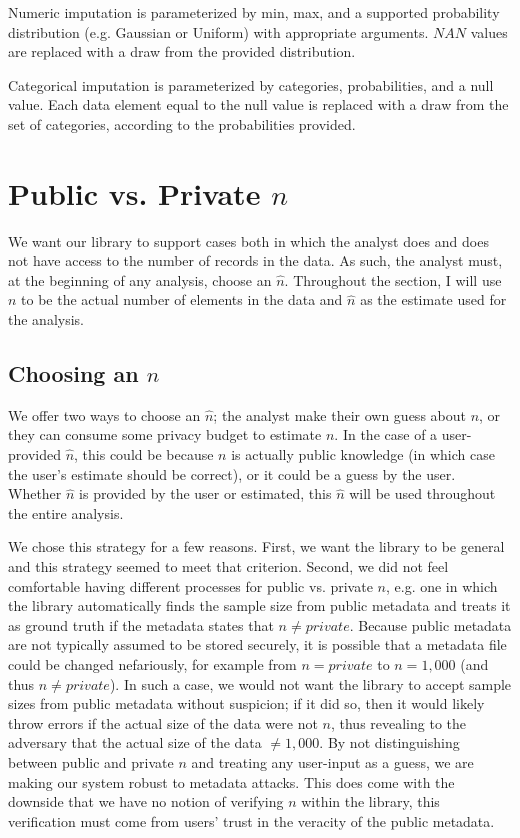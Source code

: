 \documentclass[11pt]{scrartcl} %
\begin{document}
Numeric imputation is parameterized by min, max, and a supported probability distribution (e.g. Gaussian or Uniform)
with appropriate arguments. $NAN$ values are replaced with a draw from the provided distribution. \newline

Categorical imputation is parameterized by categories, probabilities, and a null value.
Each data element equal to the null value is replaced with a draw from the set of categories,
according to the probabilities provided.

\section{Public vs. Private $n$}
We want our library to support cases both in which the analyst does and does not have access to
the number of records in the data. As such, the analyst must, at the beginning of any analysis, choose an $\hat{n}$.
Throughout the section, I will use $n$ to be the actual number of elements in the data and
$\hat{n}$ as the estimate used for the analysis.

\subsection{Choosing an $n$}
We offer two ways to choose an $\hat{n}$; the analyst make their own guess about $n$, or they can
consume some privacy budget to estimate $n$. In the case of a user-provided $\hat{n}$, this could be because
$n$ is actually public knowledge (in which case the user's estimate should be correct), or it could be
a guess by the user. Whether $\hat{n}$ is provided by the user or estimated, this $\hat{n}$ will be used throughout
the entire analysis. \newline

We chose this strategy for a few reasons. First, we want the library to be general and this strategy
seemed to meet that criterion. Second, we did not feel comfortable having different processes for
public vs. private $n$, e.g. one in which the library automatically finds the sample size from public metadata and treats
it as ground truth if the metadata states that $n \neq private$.
Because public metadata are not typically assumed to be stored securely, it is
possible that a metadata file could be changed nefariously, for example from $n = private$ to $n = 1,000$
(and thus $n \neq private$).
In such a case, we would not want the library to accept sample sizes from public metadata without
suspicion; if it did so, then it would likely throw errors if the actual size of the data were not $n$, thus
revealing to the adversary that the actual size of the data $\neq 1,000$.
By not distinguishing between public and private $n$ and treating any user-input as a guess,
we are making our system robust to metadata attacks.
This does come with the downside that we have no notion of verifying $n$ within the library, this
verification must come from users' trust in the veracity of the public metadata.
\end{document}
